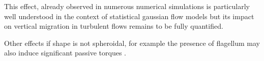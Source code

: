 This effect, already observed in numerous numerical simulations \citep{gustavsson2016preferential, borgnino2018gyrotactic} is particularly well understood in the context of statistical gaussian flow models \citep{gustavsson2016preferential} but its impact on vertical migration in turbulent flows remains to be fully quantified.

Other effects if shape is not spheroidal, for example the presence of flagellum may also induce significant passive torques \citep{kage2020shape}.



